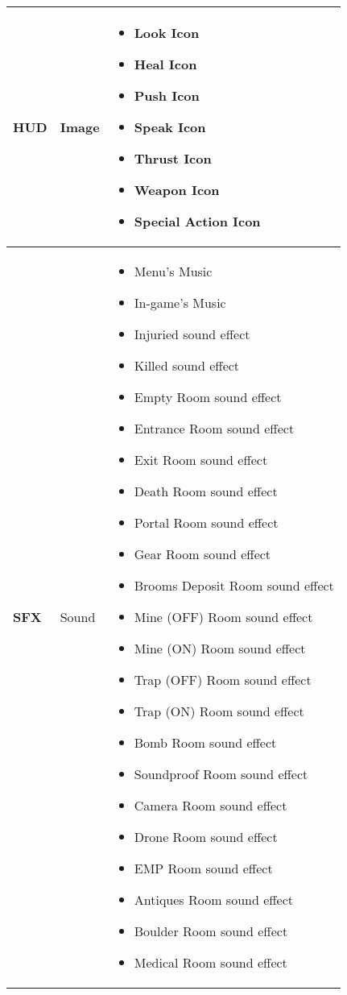 	\pagebreak
	\begin{tabular}{|m{3cm}|m{3cm}|m{7cm}|}
	\hline
	 \textbf{HUD}& Image & 
	 \begin{itemize}
     	\item Look Icon
     	\item Heal Icon
     	\item Push Icon
     	\item Speak Icon
     	\item Thrust Icon
     	\item Weapon Icon
     	\item Special Action Icon
     \end{itemize}
     \\
     \hline
     \textbf{SFX}& Sound & 
     \begin{itemize}
     	\item Menu's Music
     	\item In-game's Music
     	\item Injuried sound effect
     	\item Killed sound effect
		\item Empty Room sound effect
		\item Entrance Room sound effect
		\item Exit Room sound effect
		\item Death Room sound effect
		\item Portal Room sound effect
		\item Gear Room sound effect
		\item Brooms Deposit Room sound effect
		\item Mine (OFF) Room sound effect
		\item Mine (ON) Room sound effect
		\item Trap (OFF) Room sound effect
		\item Trap (ON) Room sound effect
		\item Bomb Room sound effect
		\item Soundproof Room sound effect
		\item Camera Room sound effect
		\item Drone Room sound effect
		\item EMP Room sound effect
		\item Antiques Room sound effect
		\item Boulder Room sound effect
		\item Medical Room sound effect	
	\end{itemize}
	\\
	\end{tabular}
	
